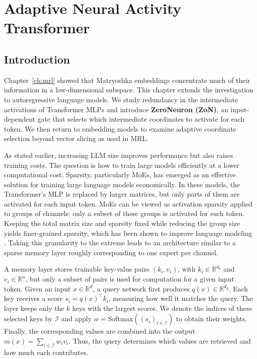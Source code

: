 \chapter[Adaptive Neural Activity Transformer]{Adaptive Neural Activity Transformer}\label{ch:zon}


\section{Introduction}
Chapter~\ref{ch:mrl} showed that Matryoshka embeddings concentrate much of their
information in a low-dimensional subspace. This chapter extends the investigation to autoregressive
language models. We study redundancy in the intermediate activations of Transformer
MLPs and introduce \textbf{ZeroNeuron (ZoN)}, an input-dependent gate that selects
which intermediate coordinates to activate for each token. We then return to
embedding models to examine adaptive coordinate selection beyond vector slicing
as used in MRL.

As stated earlier, increasing LLM size improves performance but also raises training costs.
The question is how to train large models efficiently at a lower computational cost.
Sparsity, particularly MoEs, has emerged as an
effective solution for training large language models economically. In these models, the Transformer's
MLP is replaced by larger matrices, but only parts of them are activated for each input token.
MoEs can be viewed as activation sparsity applied to groups of channels: only a subset of
these groups is activated for each token. Keeping the total matrix size and sparsity fixed while reducing
the group size yields finer-grained sparsity, which has been shown to improve language
modeling \citep{krajewski2024scaling}. Taking this granularity to the extreme leads to an architecture similar to
a sparse memory layer \citep{he2024mixturemillionexperts, lample2019largememorylayersproduct}
roughly corresponding to one expert per channel.

A memory layer \citep{weston2015memorynetworks,lample2019largememorylayersproduct} 
stores trainable key-value pairs $(k_i,v_i)$, with $k_i\in\mathbb{R}^{d_q}$ and
$v_i\in\mathbb{R}^{n}$, but only a subset of pairs is used for computation for a given input token.
Given an input $x\in\mathbb{R}^{d}$, a query network
first produces $q(x)\in\mathbb{R}^{d_q}$. Each key receives a score
$s_i=q(x)^\top k_i$, measuring how well it matches the query.
The layer keeps only the $k$ keys with the largest scores.
We denote the indices of these selected keys by $\mathcal{I}$ and apply
$w=\mathrm{Softmax}((s_i)_{i\in\mathcal{I}})$ to obtain their weights.
Finally, the corresponding values are combined into the output
$m(x)=\sum_{i\in\mathcal{I}}w_i v_i$. Thus, the query determines which values
are retrieved and how much each contributes.

